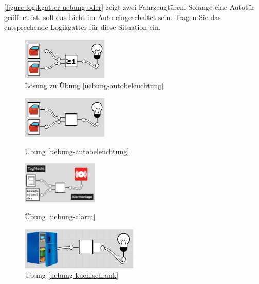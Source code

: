 \begin{exercise}\label{uebung-autobeleuchtung}
\autoref{figure-logikgatter-uebung-oder} zeigt zwei Fahrzeugtüren. Solange eine Autotür geöffnet ist, soll das Licht im Auto eingeschaltet sein. Tragen Sie das entsprechende Logikgatter für diese Situation ein.
\end{exercise}
\begin{solution}
\begin{figure}[htb]
\centering
\includegraphics[height=2cm]{uebungen/logikgatter_uebung_oder_loesung}
\caption{Lösung zu Übung \ref{uebung-autobeleuchtung}}
\label{figure-logikgatter-uebung-oder-loesung}
\end{figure}
\end{solution}

\begin{figure}[htb]
\centering
\begin{minipage}{0.275\textwidth}
\centering
\includegraphics[height=2cm]{uebungen/logikgatter_uebung_oder}
\caption{Übung \ref{uebung-autobeleuchtung}}
\label{figure-logikgatter-uebung-oder}
\end{minipage}
\hfill
\begin{minipage}{0.275\textwidth}
\centering
\includegraphics[height=2cm]{uebungen/logikgatter_uebung_und}
\caption{Übung \ref{uebung-alarm}}
\label{figure-logikgatter-uebung-und}
\centering
\end{minipage}
\hfill
\begin{minipage}{0.35\textwidth}
\centering
\includegraphics[height=2cm]{uebungen/logikgatter_uebung_nicht}
\caption{Übung \ref{uebung-kuehlschrank}}
\label{figure-logikgatter-uebung-nicht}
\centering
\end{minipage}
\end{figure}

